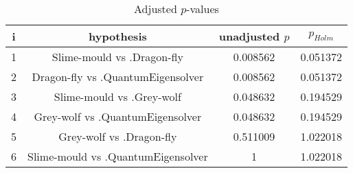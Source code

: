 \documentclass[a4paper,10pt]{article}
\begin{document}
\begin{landscape}
\begin{table}[!htp]
\centering\scriptsize
\begin{tabular}{cccc}
i&hypothesis&unadjusted $p$&$p_{Holm}$\\
\hline1&Slime-mould vs .Dragon-fly&0.008562&0.051372\\
2&Dragon-fly vs .QuantumEigensolver&0.008562&0.051372\\
3&Slime-mould vs .Grey-wolf&0.048632&0.194529\\
4&Grey-wolf vs .QuantumEigensolver&0.048632&0.194529\\
5&Grey-wolf vs .Dragon-fly&0.511009&1.022018\\
6&Slime-mould vs .QuantumEigensolver&1&1.022018\\
\hline
\end{tabular}
\caption{Adjusted $p$-values}
\end{table}

\end{landscape}
\end{document}
